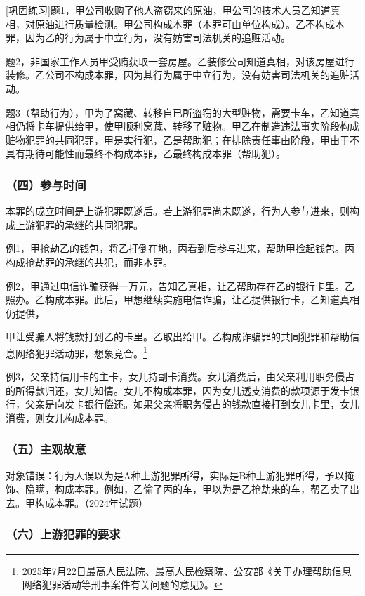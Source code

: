 [巩固练习]题1，甲公司收购了他人盗窃来的原油，甲公司的技术人员乙知道真相，对原油进行质量检测。甲公司构成本罪（本罪可由单位构成）。乙不构成本罪，因为乙的行为属于中立行为，没有妨害司法机关的追赃活动。

题2，非国家工作人员甲受贿获取一套房屋。乙装修公司知道真相，对该房屋进行装修。乙公司不构成本罪，因为其行为属于中立行为，没有妨害司法机关的追赃活动。

题3（帮助行为），甲为了窝藏、转移自已所盗窃的大型赃物，需要卡车，乙知道真相仍将卡车提供给甲，使甲顺利窝藏、转移了赃物。甲乙在制造违法事实阶段构成赃物犯罪的共同犯罪，甲是实行犯，乙是帮助犯；在排除责任事由阶段，甲由于不具有期待可能性而最终不构成本罪，乙最终构成本罪（帮助犯）。

\subsubsection*{（四）参与时间}

本罪的成立时间是上游犯罪既遂后。若上游犯罪尚未既遂，行为人参与进来，则构成上游犯罪的承继的共同犯罪。

例1，甲抢劫乙的钱包，将乙打倒在地，丙看到后参与进来，帮助甲捡起钱包。丙构成抢劫罪的承继的共犯，而非本罪。

例2，甲通过电信诈骗获得一万元，告知乙真相，让乙帮助存在乙的银行卡里。乙照办。乙构成本罪。此后，甲想继续实施电信诈骗，让乙提供银行卡，乙知道真相仍提供，

甲让受骗人将钱款打到乙的卡里。乙取出给甲。乙构成诈骗罪的共同犯罪和帮助信息网络犯罪活动罪，想象竞合。\footnote{2025年7月22日最高人民法院、最高人民检察院、公安部《关于办理帮助信息网络犯罪活动等刑事案件有关问题的意见》。}

例3，父亲持信用卡的主卡，女儿持副卡消费。女儿消费后，由父亲利用职务侵占的所得款归还，女儿知情。女儿不构成本罪，因为女儿透支消费的款项源于发卡银行，父亲是向发卡银行偿还。如果父亲将职务侵占的钱款直接打到女儿卡里，女儿消费，则女儿构成本罪。

\subsubsection*{（五）主观故意}

对象错误：行为人误以为是A种上游犯罪所得，实际是B种上游犯罪所得，予以掩饰、隐瞒，构成本罪。例如，乙偷了丙的车，甲以为是乙抢劫来的车，帮乙卖了出去。甲构成本罪。（2024年试题）

\subsubsection*{（六）上游犯罪的要求}

